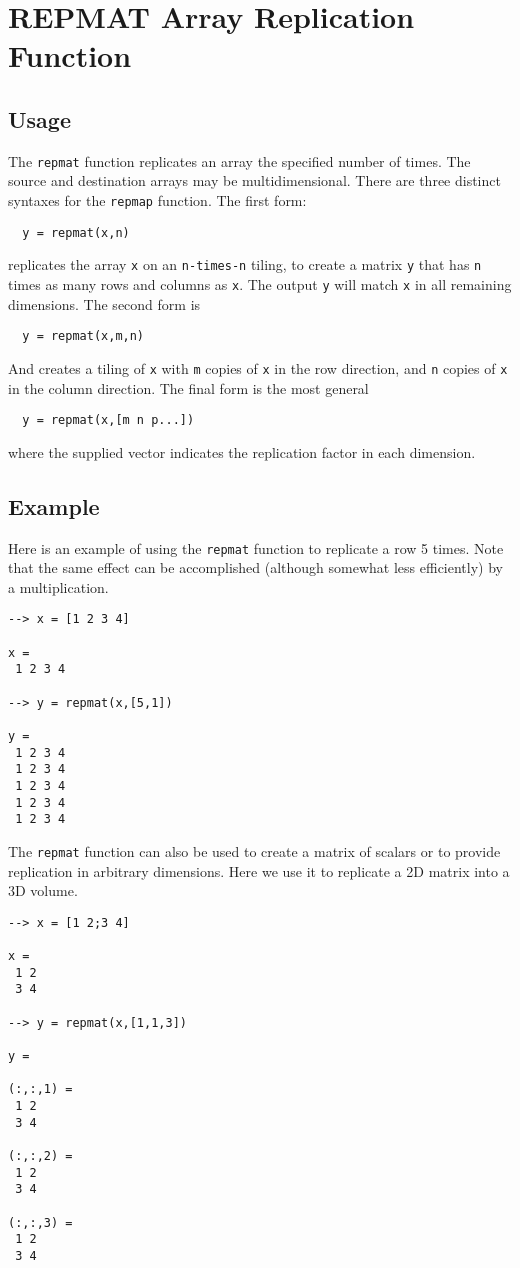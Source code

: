 \section{REPMAT Array Replication Function}

\subsection{Usage}

The \verb|repmat| function replicates an array the specified
number of times.  The source and destination arrays may
be multidimensional.  There are three distinct syntaxes for
the \verb|repmap| function.  The first form:
\begin{verbatim}
  y = repmat(x,n)
\end{verbatim}
replicates the array \verb|x| on an \verb|n-times-n| tiling, to create
a matrix \verb|y| that has \verb|n| times as many rows and columns
as \verb|x|.  The output \verb|y| will match \verb|x| in all remaining
dimensions.  The second form is
\begin{verbatim}
  y = repmat(x,m,n)
\end{verbatim}
And creates a tiling of \verb|x| with \verb|m| copies of \verb|x| in the
row direction, and \verb|n| copies of \verb|x| in the column direction.
The final form is the most general
\begin{verbatim}
  y = repmat(x,[m n p...])
\end{verbatim}
where the supplied vector indicates the replication factor in 
each dimension.  
\subsection{Example}

Here is an example of using the \verb|repmat| function to replicate
a row 5 times.  Note that the same effect can be accomplished
(although somewhat less efficiently) by a multiplication.
\begin{verbatim}
--> x = [1 2 3 4]

x = 
 1 2 3 4 

--> y = repmat(x,[5,1])

y = 
 1 2 3 4 
 1 2 3 4 
 1 2 3 4 
 1 2 3 4 
 1 2 3 4 
\end{verbatim}
The \verb|repmat| function can also be used to create a matrix of scalars
or to provide replication in arbitrary dimensions.  Here we use it to
replicate a 2D matrix into a 3D volume.
\begin{verbatim}
--> x = [1 2;3 4]

x = 
 1 2 
 3 4 

--> y = repmat(x,[1,1,3])

y = 

(:,:,1) = 
 1 2 
 3 4 

(:,:,2) = 
 1 2 
 3 4 

(:,:,3) = 
 1 2 
 3 4 
\end{verbatim}
